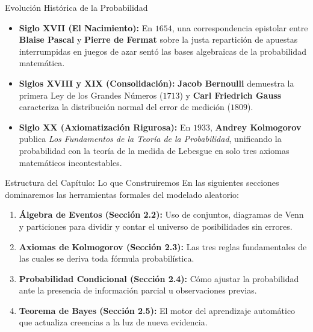 \begin{frame}{Evolución Histórica de la Probabilidad}
  \begin{itemize}
    \item \textbf{Siglo XVII (El Nacimiento):} En $1654$, una correspondencia epistolar entre \textbf{Blaise Pascal} y \textbf{Pierre de Fermat} sobre la justa repartición de apuestas interrumpidas en juegos de azar sentó las bases algebraicas de la probabilidad matemática. \pause
    \item \textbf{Siglos XVIII y XIX (Consolidación):} \textbf{Jacob Bernoulli} demuestra la primera Ley de los Grandes Números ($1713$) y \textbf{Carl Friedrich Gauss} caracteriza la distribución normal del error de medición ($1809$). \pause
    \item \textbf{Siglo XX (Axiomatización Rigurosa):} En $1933$, \textbf{Andrey Kolmogorov} publica \emph{Los Fundamentos de la Teoría de la Probabilidad}, unificando la probabilidad con la teoría de la medida de Lebesgue en solo tres axiomas matemáticos incontestables.
  \end{itemize}
\end{frame}

\begin{frame}{Estructura del Capítulo: Lo que Construiremos}
  En las siguientes secciones dominaremos las herramientas formales del modelado aleatorio:
  \vspace{0.6em}
  \begin{enumerate}
    \item \textbf{Álgebra de Eventos (Sección 2.2):} Uso de conjuntos, diagramas de Venn y particiones para dividir y contar el universo de posibilidades sin errores. \pause
    \item \textbf{Axiomas de Kolmogorov (Sección 2.3):} Las tres reglas fundamentales de las cuales se deriva toda fórmula probabilística. \pause
    \item \textbf{Probabilidad Condicional (Sección 2.4):} Cómo ajustar la probabilidad ante la presencia de información parcial u observaciones previas. \pause
    \item \textbf{Teorema de Bayes (Sección 2.5):} El motor del aprendizaje automático que actualiza creencias a la luz de nueva evidencia.
  \end{enumerate}
\end{frame}

